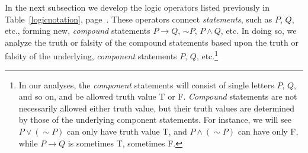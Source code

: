 In the next subsection we  develop the logic operators listed previously
in  Table~\ref{logicnotation}, page~\pageref{logicnotation}.
These operators connect {\it statements}, such as
$P$, $Q$, etc., forming new, {\it compound} statements
$P\longrightarrow Q$, $\sim P$, $P\wedge Q$,
etc.  In doing so, we analyze the truth or falsity of the compound
statements based upon the truth or falsity of the
underlying, {\it component}  statements $P$, $Q$, etc.\footnote{%
In our analyses, the {\it component} statements will consist of
single letters $P$, $Q$, and so on, 
and be allowed truth value T or F.  {\it Compound} statements
are not necessarily allowed either truth value, but their truth
values are determined by those of the underlying component statements.
For instance, we will see $P\vee(\sim P)$ can only have 
truth value T, and $P\wedge(\sim P)$ can have only F,
while $P\longrightarrow Q$ is sometimes T, sometimes F.%
}

